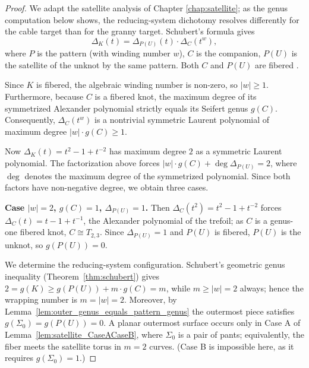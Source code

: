 \begin{proof}
We adapt the satellite analysis of Chapter \ref{chap:satellite}; as the genus computation below shows, the reducing-system dichotomy resolves differently for the cable target than for the granny target.  Schubert's formula gives
\[
\Delta_K(t) = \Delta_{P(U)}(t) \cdot \Delta_C(t^w),
\]
where $P$ is the pattern (with winding number $w$), $C$ is the companion, $P(U)$ is the satellite of the unknot by the same pattern. Both $C$ and $P(U)$ are fibered \cite[Corollary 4.15, Proposition 5.5]{BZ03}.

Since $K$ is fibered, the algebraic winding number is non-zero, so $|w| \geq 1$. Furthermore, because $C$ is a fibered knot, the maximum degree of its symmetrized Alexander polynomial strictly equals its Seifert genus $g(C)$. Consequently, $\Delta_C(t^w)$ is a nontrivial symmetric Laurent polynomial of maximum degree $|w| \cdot g(C) \geq 1$.

Now $\Delta_K(t) = t^2 - 1 + t^{-2}$ has maximum degree $2$ as a symmetric Laurent polynomial. The factorization above forces $|w| \cdot g(C) + \deg \Delta_{P(U)} = 2$, where $\deg$ denotes the maximum degree of the symmetrized polynomial. Since both factors have non-negative degree, we obtain three cases.

\textbf{Case $|w| = 2$, $g(C) = 1$, $\Delta_{P(U)} = 1$.} Then $\Delta_C(t^2) = t^2 - 1 + t^{-2}$ forces $\Delta_C(t) = t - 1 + t^{-1}$, the Alexander polynomial of the trefoil; as $C$ is a genus-one fibered knot, $C \cong T_{2,3}$. Since $\Delta_{P(U)} = 1$ and $P(U)$ is fibered, $P(U)$ is the unknot, so $g(P(U)) = 0$.

We determine the reducing-system configuration. Schubert's geometric genus inequality (Theorem~\ref{thm:schubert}) gives $2 = g(K) \geq g(P(U)) + m \cdot g(C) = m$, while $m \geq |w| = 2$ always; hence the wrapping number is $m = |w| = 2$. Moreover, by Lemma~\ref{lem:outer_genus_equals_pattern_genus} the outermost piece satisfies $g(\Sigma_0) = g(P(U)) = 0$. A planar outermost surface occurs only in Case A of Lemma~\ref{lem:satellite_CaseACaseB}, where $\Sigma_0$ is a pair of pants; equivalently, the fiber meets the satellite torus in $m = 2$ curves. (Case B is impossible here, as it requires $g(\Sigma_0) = 1$.)


\end{proof}
